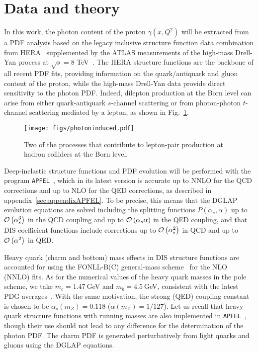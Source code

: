 \section{Data and theory}
\label{sec:theory}

In this work, the photon
content of the proton $\gamma(x,Q^2)$ will be extracted from a PDF analysis based
on the legacy inclusive structure function data combination from HERA~\cite{Abramowicz:2015mha}
supplemented by the ATLAS measurements of the high-mass Drell-Yan process
at $\sqrt{s}=8$ TeV~\cite{Aad:2016zzw}.
%
The HERA structure functions are the backbone of all
recent PDF fits, providing information on the quark/antiquark and gluon content of 
the proton, while the high-mass Drell-Yan data provide
direct sensitivity to the photon PDF.
%
Indeed, dilepton production at the Born level can arise  from either quark-antiquark $s$-channel
scattering or from photon-photon $t$-channel scattering mediated by a lepton,
as shown in Fig.~\ref{fig:photoninduced}.

\begin{figure}[h]
  \begin{center}
    \texttt{[image: figs/photoninduced.pdf]}
    \end{center}
  \caption{Two of the processes that contribute to lepton-pair
  production at hadron colliders at the Born level.}
\label{fig:photoninduced}
\end{figure}

Deep-inelastic structure functions and PDF evolution will be performed
with the program {\tt APFEL}~\cite{Bertone:2013vaa}, which in its latest
version is accurate up to NNLO for the QCD corrections and up to
NLO for the QED corrections, as described in appendix~\ref{sec:appendixAPFEL}.
%
To be precise, this means that the DGLAP evolution equations are solved including
the splitting functions $P(\alpha_s,\alpha)$ up to $\mathcal{O}\left( \alpha_s^3\right)$ in the QCD
coupling and up to $\mathcal{O}\left( \alpha_s\alpha\right)$ in the QED coupling,
and that DIS coefficient functions include corrections up to $\mathcal{O}\left( \alpha_s^2\right)$
in QCD and up to $\mathcal{O}\left( \alpha^2\right)$ in QED.

Heavy quark (charm and bottom) mass effects in DIS structure functions are accounted
for using the FONLL-B(C) general-mass scheme~\cite{Forte:2010ta}
for the NLO (NNLO) fits.
%
As for the numerical values of the heavy quark masses in the pole scheme,
we take  $m_c=1.47~$GeV and $m_b=4.5~$GeV, consistent with the latest
PDG averages~\cite{Agashe:2014kda}.
%
With the same motivation, the strong (QED) coupling constant is chosen to be  $\alpha_s(m_Z)=0.118$
($\alpha(m_Z)=1/127$).
%
Let us recall that heavy quark structure functions with running masses
are also implemented in {\tt APFEL}~\cite{Bertone:2016ywq},
though their use should not lead to any difference for the determination of the photon PDF.
%
The charm PDF is generated perturbatively from light quarks and gluons using
the DGLAP equations.

